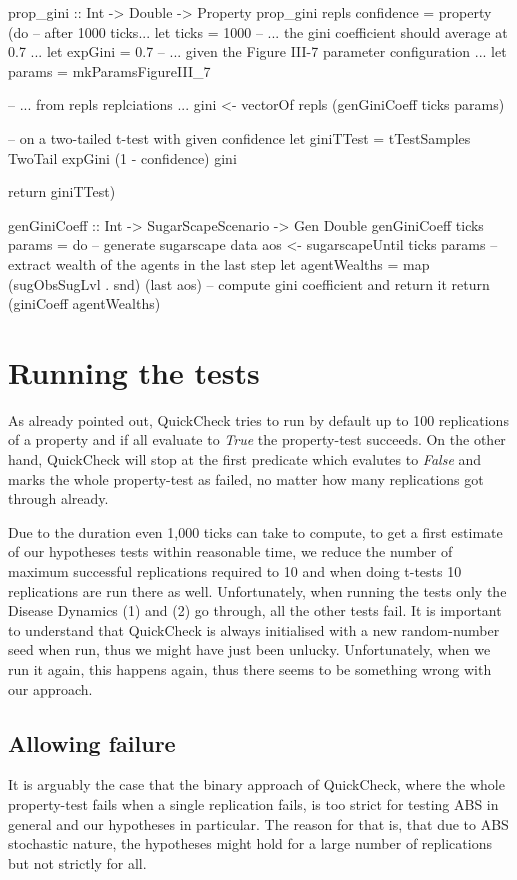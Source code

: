 \begin{HaskellCode}
prop_gini :: Int -> Double -> Property
prop_gini repls confidence = property (do
  -- after 1000 ticks...
  let ticks = 1000
  -- ... the gini coefficient should average at 0.7 ...
  let expGini = 0.7
  -- ... given the Figure III-7 parameter configuration ...
  let params = mkParamsFigureIII_7
  
  -- ... from repls replciations ... 
  gini <- vectorOf repls (genGiniCoeff ticks params)

  -- on a two-tailed t-test with given confidence
  let giniTTest = tTestSamples TwoTail expGini (1 - confidence) gini

  return giniTTest)
  
genGiniCoeff :: Int -> SugarScapeScenario -> Gen Double
genGiniCoeff ticks params = do
  -- generate sugarscape data
  aos <- sugarscapeUntil ticks params
  -- extract wealth of the agents in the last step
  let agentWealths = map (sugObsSugLvl . snd) (last aos)
  -- compute gini coefficient and return it
  return (giniCoeff agentWealths)
\end{HaskellCode}

\section{Running the tests}
As already pointed out, QuickCheck tries to run by default up to 100 replications  of a property and if all evaluate to \textit{True} the property-test succeeds. On the other hand, QuickCheck will stop at the first predicate which evalutes to \textit{False} and marks the whole property-test as failed, no matter how many replications got through already. 

Due to the duration even 1,000 ticks can take to compute, to get a first estimate of our hypotheses tests within reasonable time, we reduce the number of maximum successful replications required to 10 and when doing t-tests 10 replications are run there as well. Unfortunately, when running the tests only the Disease Dynamics (1) and (2) go through, all the other tests fail. It is important to understand that QuickCheck is always initialised with a new random-number seed when run, thus we might have just been unlucky. Unfortunately, when we run it again, this happens again, thus there seems to be something wrong with our approach.

\subsection{Allowing failure}
It is arguably the case that the binary approach of QuickCheck, where the whole property-test fails when a single replication fails, is too strict for testing ABS in general and our hypotheses in particular. The reason for that is, that due to ABS stochastic nature, the hypotheses might hold for a large number of replications but not strictly for all.


